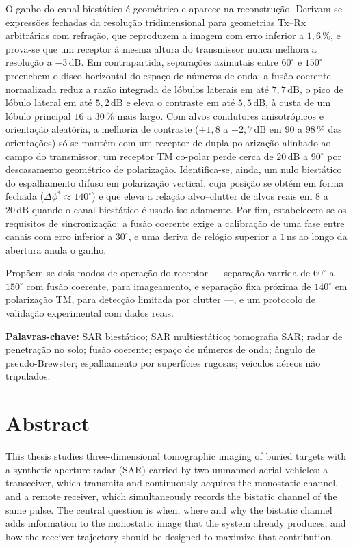 \documentclass[12pt,a4paper,oneside]{book}
\theoremstyle{remark}
\newcommand{\dB}{\,\mathrm{dB}}
\theoremstyle{plain}
\theoremstyle{definition}
\begin{document}
O ganho do canal biestático é geométrico e aparece na reconstrução. Derivam-se
expressões fechadas da resolução tridimensional para geometrias Tx--Rx
arbitrárias com refração, que reproduzem a imagem com erro inferior a $1,6\,\%$,
e prova-se que um receptor à mesma altura do transmissor nunca melhora a
resolução a $-3\dB$. Em contrapartida, separações azimutais entre $60^\circ$ e
$150^\circ$ preenchem o disco horizontal do espaço de números de onda: a fusão
coerente normalizada reduz a razão integrada de lóbulos laterais em até
$7,7\dB$, o pico de lóbulo lateral em até $5,2\dB$ e eleva o contraste em até
$5,5\dB$, à custa de um lóbulo principal $16$ a $30\,\%$ mais largo. Com alvos
condutores anisotrópicos e orientação aleatória, a melhoria de contraste
(${+}1,8$ a ${+}2,7\dB$ em $90$ a $98\,\%$ das orientações) só se mantém com um
receptor de dupla polarização alinhado ao campo do transmissor; um receptor TM
co-polar perde cerca de $20\dB$ a $90^\circ$ por descasamento geométrico de
polarização. Identifica-se, ainda, um nulo biestático do espalhamento difuso
em polarização vertical, cuja posição se obtém em forma fechada
($\Delta\phi^\ast\approx140^\circ$) e que eleva a relação alvo--clutter de
alvos reais em $8$ a $20\dB$ quando o canal biestático é usado isoladamente.
Por fim, estabelecem-se os requisitos de sincronização: a fusão coerente exige
a calibração de uma fase entre canais com erro inferior a $30^\circ$, e uma
deriva de relógio superior a $1\,$ns ao longo da abertura anula o ganho.

Propõem-se dois modos de operação do receptor --- separação varrida de
$60^\circ$ a $150^\circ$ com fusão coerente, para imageamento, e separação fixa
próxima de $140^\circ$ em polarização TM, para detecção limitada por clutter
---, e um protocolo de validação experimental com dados reais.

\vspace{1em}
\noindent\textbf{Palavras-chave:} SAR biestático; SAR multiestático;
tomografia SAR; radar de penetração no solo; fusão coerente; espaço de números
de onda; ângulo de pseudo-Brewster; espalhamento por superfícies rugosas;
veículos aéreos não tripulados.

\chapter*{Abstract}

This thesis studies three-dimensional tomographic imaging of buried targets
with a synthetic aperture radar (SAR) carried by two unmanned aerial vehicles:
a transceiver, which transmits and continuously acquires the monostatic
channel, and a remote receiver, which simultaneously records the bistatic
channel of the same pulse. The central question is when, where and why the
bistatic channel adds information to the monostatic image that the system
already produces, and how the receiver trajectory should be designed to
maximize that contribution.
\end{document}
